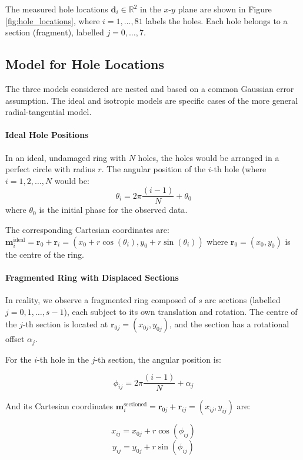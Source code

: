 \documentclass[11pt]{article}
\begin{document}
The measured hole locations $\mathbf{d}_i \in \mathbb{R}^2$ in the $x$-$y$ plane are shown in Figure \ref{fig:hole_locations}, where $i = 1, \ldots, 81$ labels the holes. Each hole belongs to a section (fragment), labelled $j = 0, \ldots, 7$.



\subsection{Model for Hole Locations}


The three models considered are nested and based on a common Gaussian error assumption. The ideal and isotropic models are specific cases of the more general radial-tangential model.

\paragraph{Ideal Hole Positions}
\label{sec:ideal}
In an ideal, undamaged ring with $N$ holes, the holes would be arranged in a perfect circle with radius $r$. The angular position of the $i$-th hole (where $i = 1, 2, \ldots, N$ would be:
$$\theta_i = 2\pi \frac{(i-1)}{N} + \theta_0$$
where $\theta_0$ is the initial phase for the observed data.

The corresponding Cartesian coordinates are:
 $\mathbf{m}_i^{\text{ideal}}=\mathbf{r}_0+\mathbf{r}_i = \left(x_0+r \cos(\theta_i), y_0 + r \sin(\theta_i)\right)$
where $\mathbf{r}_0 = (x_0, y_0)$ is the centre of the ring.

\paragraph{Fragmented Ring with Displaced Sections}

In reality, we observe a fragmented ring composed of $s$ arc sections (labelled $j = 0, 1, \ldots, s-1$), each subject to its own translation and rotation. The centre of the $j$-th section is located at $\mathbf{r}_{0j} = (x_{0j}, y_{0j})$, and the section has a rotational offset $\alpha_j$.


For the $i$-th hole in the $j$-th section, the angular position is:

$$\phi_{ij} = 2\pi \frac{(i-1)}{N} + \alpha_j$$

And its Cartesian coordinates $\mathbf{m}_{i}^{\text{sectioned}}=\mathbf{r}_{0j} + \mathbf{r}_{ij}=(x_{ij},y_{ij})$ are:

$$x_{ij} = x_{0j} + r \cos(\phi_{ij})$$
$$y_{ij} = y_{0j} + r \sin(\phi_{ij})$$
\end{document}
